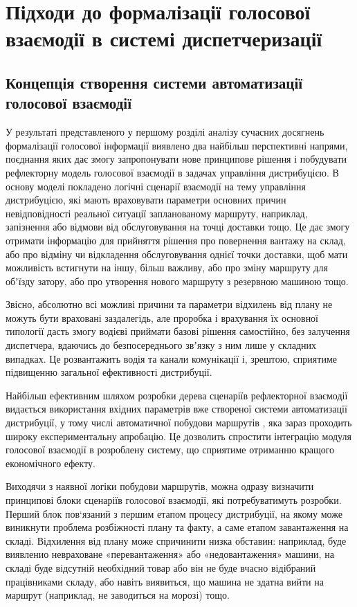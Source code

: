 \chapter{Підходи до формалізації голосової взаємодії в системі диспетчеризації} \label{chapt2}

\section{Концепція створення системи автоматизації голосової взаємодії} \label{sect2_1}

У результаті представленого у першому розділі аналізу сучасних досягнень формалізації голосової інформації  виявлено два найбільш перспективні напрями, поєднання яких дає змогу запропонувати нове принципове рішення і побудувати рефлекторну модель голосової взаємодії в задачах управління дистрибуцією. В основу моделі покладено логічні сценарії взаємодії на тему управління дистрибуцією, які мають враховувати параметри основних причин невідповідності реальної ситуації запланованому маршруту, наприклад, запізнення або відмови від обслуговування на точці доставки тощо. Це дає змогу отримати інформацію для прийняття рішення про повернення вантажу на склад, або про відміну чи відкладення обслуговування однієї точки доставки, щоб мати можливість встигнути на іншу, більш важливу, або про зміну маршруту для обʼїзду затору, або про утворення нового маршруту з резервною машиною тощо.

Звісно, абсолютно всі можливі причини та параметри відхилень від плану не можуть бути враховані заздалегідь, але проробка і врахування їх основної типології дасть змогу водієві приймати базові рішення самостійно, без залучення диспетчера, вдаючись до безпосереднього звʼязку з ним лише у складних випадках. Це розвантажить водія та канали комунікації і, зрештою, сприятиме підвищенню загальної ефективності дистрибуції.

Найбільш ефективним шляхом розробки дерева сценаріїв рефлекторної взаємодії видається використання вхідних параметрів вже створеної системи автоматизації дистрибуції, у тому числі автоматичної побудови маршрутів \cite{as6}, яка зараз проходить широку експериментальну апробацію. Це дозволить спростити інтеграцію модуля голосової взаємодії в розроблену систему, що сприятиме отриманню кращого економічного ефекту.

Виходячи з наявної логіки побудови маршрутів, можна одразу визначити принципові блоки сценаріїв голосової взаємодії, які потребуватимуть розробки. Перший блок пов`язаний з першим етапом процесу дистрибуції, на якому може виникнути проблема розбіжності плану та факту, а саме етапом завантаження на складі. Відхилення від плану може спричинити низка обставин: наприклад, буде виявленио невраховане «перевантаження» або «недовантаження» машини, на складі буде відсутній необхідний товар або  він не буде вчасно відібраний працівниками складу, або навіть виявиться, що машина не здатна вийти на маршрут (наприклад, не заводиться на морозі) тощо.

